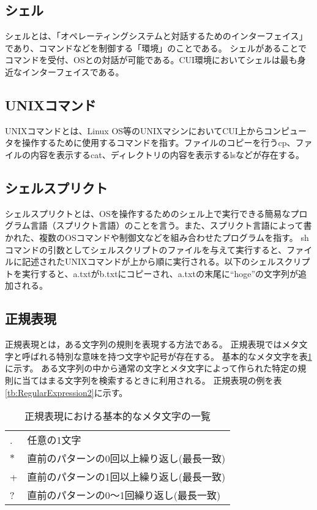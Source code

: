 \subsection{シェル}
シェルとは、「オペレーティングシステムと対話するためのインターフェイス」であり、コマンドなどを制御する「環境」のことである。
シェルがあることでコマンドを受付、OSとの対話が可能である。CUI環境においてシェルは最も身近なインターフェイスである。


\subsection{UNIXコマンド}
UNIXコマンドとは、Linux OS等のUNIXマシンにおいてCUI上からコンピュータを操作するために使用するコマンドを指す。ファイルのコピーを行うcp、ファイルの内容を表示するcat、ディレクトリの内容を表示するlsなどが存在する。


\subsection{シェルスプリクト}
シェルスプリクトとは、OSを操作するためのシェル上で実行できる簡易なプログラム言語（スプリクト言語）のことを言う。また、スプリクト言語によって書かれた、複数のOSコマンドや制御文などを組み合わせたプログラムを指す。
shコマンドの引数としてシェルスクリプトのファイルを与えて実行すると、ファイルに記述されたUNIXコマンドが上から順に実行される。以下のシェルスクリプトを実行すると、a.txtがb.txtにコピーされ、a.txtの末尾に“hoge”の文字列が追加される。



\subsection{正規表現}

正規表現とは，ある文字列の規則を表現する方法である。
正規表現ではメタ文字と呼ばれる特別な意味を持つ文字や記号が存在する。
基本的なメタ文字を表\ref{tb:RegularExpression}に示す。
ある文字列の中から通常の文字とメタ文字によって作られた特定の規則に当てはまる文字列を検索するときに利用される。
正規表現の例を表\ref{tb:RegularExpression2}に示す。

\begin{table}[t]
\begin{center}
\caption{正規表現における基本的なメタ文字の一覧}
\begin{tabular}{ll} \hline
. & 任意の1文字 \\
$\ast$ & 直前のパターンの0回以上繰り返し(最長一致) \\
+ & 直前のパターンの1回以上繰り返し(最長一致) \\
? & 直前のパターンの0～1回繰り返し(最長一致) \\ \hline
\end{tabular}
\label{tb:RegularExpression}
\end{center}
\end{table}

